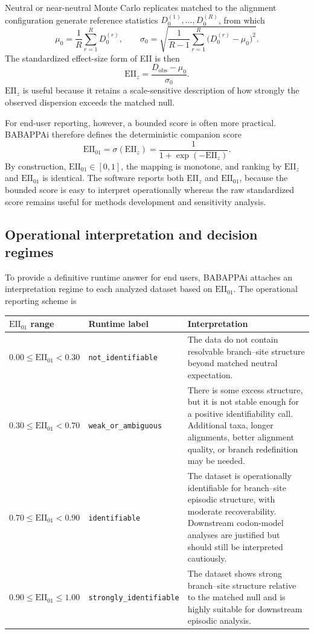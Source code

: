 \documentclass[11pt]{article}
\begin{document}
Neutral or near-neutral Monte Carlo replicates matched to the alignment configuration generate reference statistics $D_0^{(1)},\ldots,D_0^{(R)}$, from which
\[
\mu_0=\frac{1}{R}\sum_{r=1}^{R}D_0^{(r)},
\qquad
\sigma_0=\sqrt{\frac{1}{R-1}\sum_{r=1}^{R}\big(D_0^{(r)}-\mu_0\big)^2}.
\]
The standardized effect-size form of EII is then
\[
\mathrm{EII}_{z}=\frac{D_{\mathrm{obs}}-\mu_0}{\sigma_0}.
\]
$\mathrm{EII}_{z}$ is useful because it retains a scale-sensitive description of how strongly the observed dispersion exceeds the matched null.

For end-user reporting, however, a bounded score is often more practical. BABAPPAi therefore defines the deterministic companion score
\[
\mathrm{EII}_{01}=\sigma\!\left(\mathrm{EII}_{z}\right)=\frac{1}{1+\exp\!\left(-\mathrm{EII}_{z}\right)}.
\]
By construction, $\mathrm{EII}_{01}\in[0,1]$, the mapping is monotone, and ranking by $\mathrm{EII}_{z}$ and $\mathrm{EII}_{01}$ is identical. The software reports both $\mathrm{EII}_{z}$ and $\mathrm{EII}_{01}$, because the bounded score is easy to interpret operationally whereas the raw standardized score remains useful for methods development and sensitivity analysis.

\subsection{Operational interpretation and decision regimes}

To provide a definitive runtime answer for end users, BABAPPAi attaches an interpretation regime to each analyzed dataset based on $\mathrm{EII}_{01}$. The operational reporting scheme is
\begin{center}
\begin{tabular}{>{\raggedright\arraybackslash}p{2.4cm} >{\raggedright\arraybackslash}p{4.0cm} >{\raggedright\arraybackslash}p{6.3cm}}
\toprule
$\mathrm{EII}_{01}$ range & Runtime label & Interpretation \\
\midrule
$0.00\le \mathrm{EII}_{01}<0.30$ & \texttt{not\_identifiable} & The data do not contain resolvable branch--site structure beyond matched neutral expectation. \\
$0.30\le \mathrm{EII}_{01}<0.70$ & \texttt{weak\_or\_ambiguous} & There is some excess structure, but it is not stable enough for a positive identifiability call. Additional taxa, longer alignments, better alignment quality, or branch redefinition may be needed. \\
$0.70\le \mathrm{EII}_{01}<0.90$ & \texttt{identifiable} & The dataset is operationally identifiable for branch--site episodic structure, with moderate recoverability. Downstream codon-model analyses are justified but should still be interpreted cautiously. \\
$0.90\le \mathrm{EII}_{01}\le 1.00$ & \texttt{strongly\_identifiable} & The dataset shows strong branch--site structure relative to the matched null and is highly suitable for downstream episodic analysis. \\
\bottomrule
\end{tabular}
\end{center}
\end{document}
